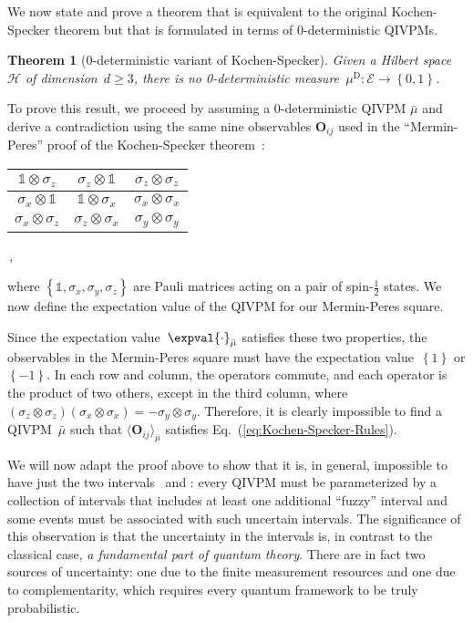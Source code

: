 \documentclass[english,reprint, aps, prl,superscriptaddress, showpacs,
showkeys, longbibliography, amsmath, amssymb]{revtex4-1}
\theoremstyle{plain}
\newtheorem{thm}{Theorem}
\theoremstyle{definition}
\newcommand{\Hilb}{\mathcal{H}}
\newcommand{\events}{\ensuremath{\mathcal{E}}}
\newcommand{\imposs}{{\text{\wesa{impossible}}}}
\newcommand{\necess}{{\text{\wesa{certain}}}}
\begin{document}
We now state and prove a theorem that is equivalent to the original
Kochen-Specker theorem but that is formulated in terms of
$0$-deterministic QIVPMs. 


\begin{thm}[0-deterministic variant of Kochen-Specker] 
\label{thm:Kochen-Specker}
Given a Hilbert space $\Hilb$ of dimension~$d\ge3$, there is no
0-deterministic
measure~$\mu^{\mathrm{D}}:\events\rightarrow\left\{ 0,1\right\}$.
\end{thm}

To prove this result, we proceed by assuming a 0-deterministic QIVPM
$\bar{\mu}$ and derive a contradiction using the same nine observables
$\mathbf{O}_{ij}$ used in the ``Mermin-Peres'' proof of the
Kochen-Specker theorem~\cite{Mermin1990Simple,peres1995quantum}:
{\renewcommand{\arraystretch}{2}%
\begin{center}
\begin{tabular}{|@{\quad}c@{\quad}|@{\quad}c@{\quad}|@{\quad}c@{\quad}|}
\hline 
$\mathbb{1}\otimes\sigma_{z}$  & $\sigma_{z}\otimes\mathbb{1}$  & $\sigma_{z}\otimes\sigma_{z}$ \tabularnewline
\hline 
$\sigma_{x}\otimes\mathbb{1}$  & $\mathbb{1}\otimes\sigma_{x}$  & $\sigma_{x}\otimes\sigma_{x}$ \tabularnewline
\hline 
$\sigma_{x}\otimes\sigma_{z}$  & $\sigma_{z}\otimes\sigma_{x}$  & $\sigma_{y}\otimes\sigma_{y}$ \tabularnewline
\hline 
\end{tabular}\,,
\par\end{center}
}
\noindent where $\left\{\mathbb{1},\sigma_{x},\sigma_{y},\sigma_{z}\right\}$ are
Pauli matrices acting on a pair of spin-$\frac{1}{2}$ states. We now define the
expectation value of the QIVPM for our Mermin-Peres square.

Since the expectation value~$\expval{\cdot}_{\bar{\mu}}$ satisfies
these two properties, the observables in the Mermin-Peres square must
have the expectation value~$\left\{ 1\right\} $ or
$\left\{ -1\right\} $.  In each row and column, the operators commute,
and each operator is the product of two others, except in the third
column, where
$\left(\sigma_{z}\otimes\sigma_{z}\right)\left(\sigma_{x}\otimes\sigma_{x}\right)=-\sigma_{y}\otimes\sigma_{y}$.
Therefore, it is clearly impossible to find a QIVPM~$\bar{\mu}$ such
that $\langle \mathbf{O}_{ij}\rangle_{\bar \mu}$ satisfies
Eq.~(\ref{eq:Kochen-Specker-Rules}).
 
We will now adapt the proof above to show that it is, in general,
impossible to have just the two intervals \imposs\ and \necess: every
QIVPM must be parameterized by a collection of intervals that includes
at least one additional ``fuzzy'' interval and some events must be
associated with such uncertain intervals. The significance of this
observation is that the uncertainty in the intervals is, in contrast
to the classical case, \emph{a fundamental part of quantum
  theory}. There are in fact two sources of uncertainty: one due to
the finite measurement resources and one due to complementarity, which
requires every quantum framework to be truly probabilistic.
\end{document}
